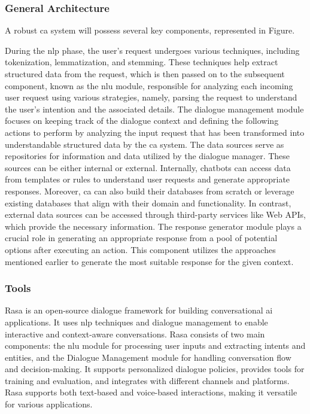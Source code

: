 \documentclass[a4paper,fleqn]{cas-dc}
\begin{document}
\subsubsection{General Architecture}

A robust \gls{ca} system will possess several key components, represented in Figure.%


During the \gls{nlp} phase, the user's request undergoes various techniques, including tokenization, lemmatization, and stemming. These techniques help extract structured data from the request, which is then passed on to the subsequent component, known as the \gls{nlu} module, responsible for analyzing each incoming user request using various strategies, namely, parsing the request to understand the user's intention and the associated details. The dialogue management module focuses on keeping track of the dialogue context and defining the following actions to perform by analyzing the input request that has been transformed into understandable structured data by the \gls{ca} system. The data sources serve as repositories for information and data utilized by the dialogue manager. These sources can be either internal or external. Internally, chatbots can access data from templates or rules to understand user requests and generate appropriate responses. Moreover, \gls{ca} can also build their databases from scratch or leverage existing databases that align with their domain and functionality. In contrast, external data sources can be accessed through third-party services like Web APIs, which provide the necessary information. The response generator module plays a crucial role in generating an appropriate response from a pool of potential options after executing an action. This component utilizes the approaches mentioned earlier to generate the most suitable response for the given context.

\subsubsection{Tools}

Rasa \cite{rasa} is an open-source dialogue framework for building conversational \gls{ai} applications. It uses \gls{nlp} techniques and dialogue management to enable interactive and context-aware conversations. Rasa consists of two main components: the \gls{nlu} module for processing user inputs and extracting intents and entities, and the Dialogue Management module for handling conversation flow and decision-making. It supports personalized dialogue policies, provides tools for training and evaluation, and integrates with different channels and platforms. Rasa supports both text-based and voice-based interactions, making it versatile for various applications.
\end{document}
